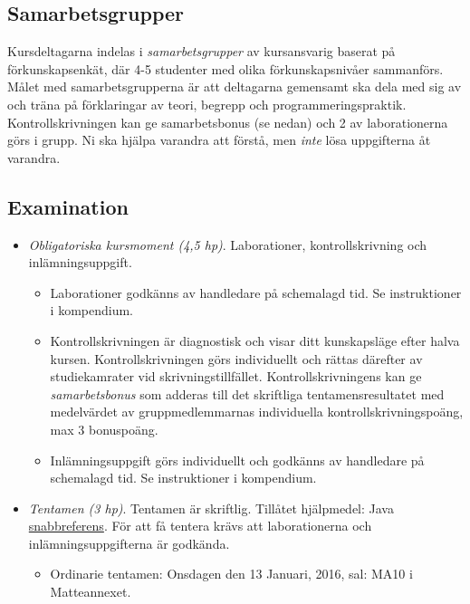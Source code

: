 \subsection{Samarbetsgrupper}\label{samarbetsgrupper}

Kursdeltagarna indelas i \emph{samarbetsgrupper} av kursansvarig baserat
på förkunskapsenkät, där 4-5 studenter med olika förkunskapsnivåer
sammanförs. Målet med samarbetsgrupperna är att deltagarna gemensamt ska
dela med sig av och träna på förklaringar av teori, begrepp och
programmeringspraktik. Kontrollskrivningen kan ge samarbetsbonus (se
nedan) och 2 av laborationerna görs i grupp. Ni ska hjälpa varandra att
förstå, men \emph{inte} lösa uppgifterna åt varandra.

\subsection{Examination}\label{examination}

\begin{itemize}
\item
  \emph{Obligatoriska kursmoment (4,5 hp)}. Laborationer,
  kontrollskrivning och inlämningsuppgift.

  \begin{itemize}
  \item
    Laborationer godkänns av handledare på schemalagd tid. Se
    instruktioner i kompendium.
  \item
    Kontrollskrivningen är diagnostisk och visar ditt kunskapsläge efter
    halva kursen. Kontrollskrivningen görs individuellt och rättas
    därefter av studiekamrater vid skrivningstillfället.
    Kontrollskrivningens kan ge \emph{samarbetsbonus} som adderas till
    det skriftliga tentamensresultatet med medelvärdet av
    gruppmedlemmarnas individuella kontrollskrivningspoäng, max 3
    bonuspoäng.
  \item
    Inlämningsuppgift görs individuellt och godkänns av handledare på
    schemalagd tid. Se instruktioner i kompendium.
  \end{itemize}
\item
  \emph{Tentamen (3 hp)}. Tentamen är skriftlig. Tillåtet hjälpmedel:
  Java \href{http://cs.lth.se/eda016/javaref}{snabbreferens}. För att få
  tentera krävs att laborationerna och inlämningsuppgifterna är
  godkända.

  \begin{itemize}
  \itemsep1pt\parskip0pt
  \item
    Ordinarie tentamen: Onsdagen den 13 Januari, 2016, sal: MA10 i
    Matteannexet.
  \end{itemize}
\end{itemize}
